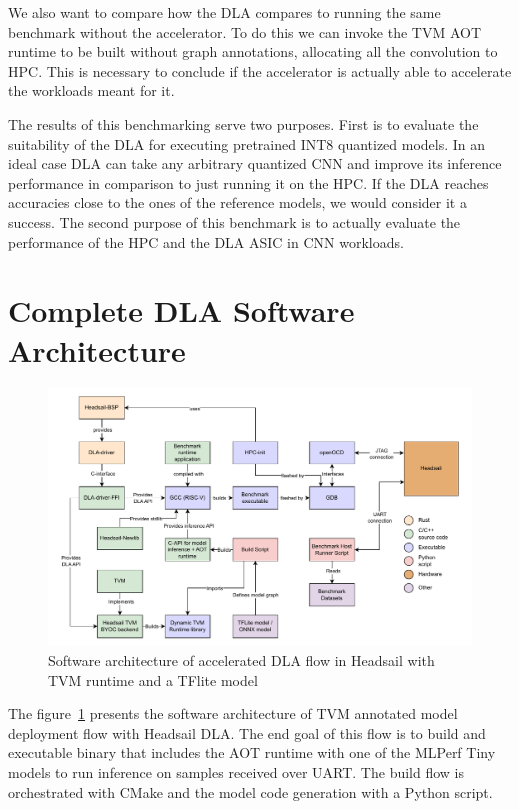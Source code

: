 \documentclass[12pt,a4paper,english
]{tunithesis}
\begin{document}
We also want to compare how the DLA compares to running the same benchmark without the accelerator. To do this we can invoke the TVM AOT runtime to be built without graph annotations, allocating all the convolution to HPC. This is necessary to conclude if the accelerator is actually able to accelerate the workloads meant for it.

The results of this benchmarking serve two purposes. First is to evaluate the suitability of the DLA for executing pretrained INT8 quantized models. In an ideal case DLA can take any arbitrary quantized CNN and improve its inference performance in comparison to just running it on the HPC. If the DLA reaches accuracies close to the ones of the reference models, we would consider it a success.
The second purpose of this benchmark is to actually evaluate the performance of the HPC and the DLA ASIC in CNN workloads.

\section{Complete DLA Software Architecture}
\begin{figure}
\centering
\includegraphics[width=\linewidth]{img/dla-architecture-new.pdf}
\caption{Software architecture of accelerated DLA flow in Headsail with TVM runtime and a TFlite model}
\label{fig:architecture}
\end{figure}

The figure~\ref{fig:architecture} presents the software architecture of TVM annotated model deployment flow with Headsail DLA. The end goal of this flow is to build and executable binary that includes the AOT runtime with one of the MLPerf Tiny models to run inference on samples received over UART. The build flow is orchestrated with CMake and the model code generation with a Python script.
\end{document}
